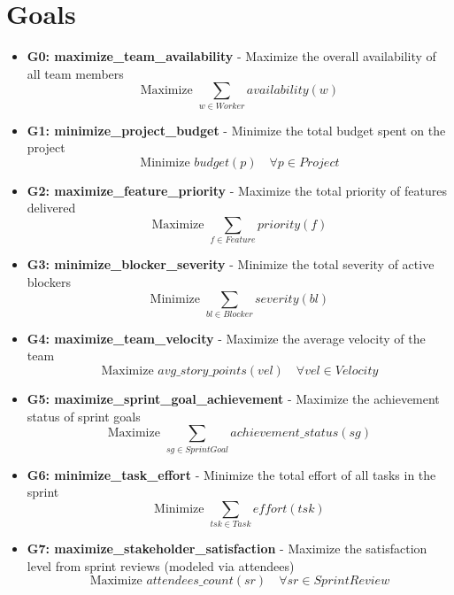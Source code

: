 \documentclass[11pt]{article}
\begin{document}
\section{Goals}
\begin{itemize}
    \item \textbf{G0: maximize\_team\_availability} - Maximize the overall availability of all team members
          \[ \text{Maximize } \sum_{w \in Worker} availability(w) \]
    \item \textbf{G1: minimize\_project\_budget} - Minimize the total budget spent on the project
          \[ \text{Minimize } budget(p) \quad \forall p \in Project \]
    \item \textbf{G2: maximize\_feature\_priority} - Maximize the total priority of features delivered
          \[ \text{Maximize } \sum_{f \in Feature} priority(f) \]
    \item \textbf{G3: minimize\_blocker\_severity} - Minimize the total severity of active blockers
          \[ \text{Minimize } \sum_{bl \in Blocker} severity(bl) \]
    \item \textbf{G4: maximize\_team\_velocity} - Maximize the average velocity of the team
          \[ \text{Maximize } avg\_story\_points(vel) \quad \forall vel \in Velocity \]
    \item \textbf{G5: maximize\_sprint\_goal\_achievement} - Maximize the achievement status of sprint goals
          \[ \text{Maximize } \sum_{sg \in SprintGoal} achievement\_status(sg) \]
    \item \textbf{G6: minimize\_task\_effort} - Minimize the total effort of all tasks in the sprint
          \[ \text{Minimize } \sum_{tsk \in Task} effort(tsk) \]
    \item \textbf{G7: maximize\_stakeholder\_satisfaction} - Maximize the satisfaction level from sprint reviews (modeled via attendees)
          \[ \text{Maximize } attendees\_count(sr) \quad \forall sr \in SprintReview \]
\end{itemize}
\end{document}
